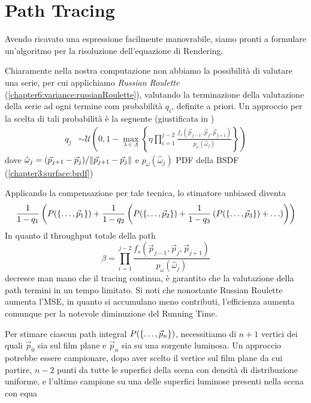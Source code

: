 \section{Path Tracing}
Avendo ricavato una espressione facilmente manovrabile, siamo pronti a formulare un'algoritmo per la risoluzione dell'equazione di Rendering.\par
Chiaramente nella nostra computazione non abbiamo la possibilit\`a di valutare una serie, per cui applichiamo \textit{Russian Roulette} 
(\ref{chapter6:variance:russianRoulette}), valutando la terminazione della valutazione della serie ad ogni termine com probabilit\`a $q_i$, definite 
a priori. Un approccio per la scelta di tali probabilit\`a \`e la seguente (giustificata in \cite{pharr})
\begin{align}
	q_j&\sim\mathcal{U}\left(0,1-\max_{\lambda\in\Lambda}\left\{
		\eta\prod_{i=1}^{j-2}\frac{f_s(\vec{p}_{j-1},\vec{p}_j,\vec{p}_{j+1})}{p_\omega(\hat{\omega}_j)}\right\}\right)
\end{align}
dove $\hat{\omega}_j=(\vec{p}_{j+1}-\vec{p}_j)/\norm{\vec{p}_{j+1}-\vec{p}_j}$ e $p_\omega(\hat{\omega}_j)$ PDF della BSDF 
(\ref{chapter3:surface:brdf})\par
Applicando la compensazione per tale tecnica, lo stimatore unbiased diventa
\begin{equation}\label{chapter8:pt:russianroulette}
	\frac{1}{1-q_1}\left(P(\{\ldots,\vec{p}_{1}\})+\frac{1}{1-q_2}\left(P(\{\ldots,\vec{p}_{2}\})+\frac{1}{1-q_3}\left(P(\{\ldots,\vec{p}_{3}\})+\ldots\right)\right)\right)
\end{equation}
In quanto il throughput totale della path
\begin{equation*}
	\beta=\prod_{i=1}^{j-2}\frac{f_s(\vec{p}_{j-1},\vec{p}_j,\vec{p}_{j+1})}{p_\omega(\hat{\omega}_j)}
\end{equation*}
decresce man mano che il tracing continua, \`e garantito che la valutazione della path termini in un tempo limitato. Si noti che nonostante Russian
Roulette aumenta l'MSE, in quanto si accumulano meno contributi, l'efficienza aumenta comunque per la notevole diminuzione del Running Time.\par
Per stimare ciascun path integral $P(\{\ldots,\vec{p}_{n}\})$, necessitiamo di $n+1$ vertici dei quali $\vec{p}_0$ sia sul film plane e $\vec{p}_n$ sia su una 
sorgente luminosa. Un approccio potrebbe essere campionare, dopo aver scelto il vertice sul film plane da cui partire, $n-2$ punti da tutte le 
superfici della scena con densit\`a di distribuzione uniforme, e l'ultimo campione su una delle superfici luminose presenti nella scena con equa

